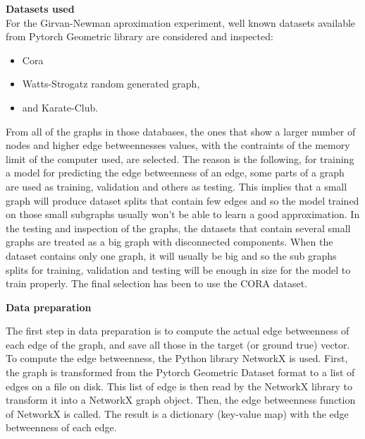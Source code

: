 \textbf{Datasets used}\\
For the Girvan-Newman aproximation experiment, well known datasets available from Pytorch Geometric library are considered and inspected:
\begin{itemize}
	\item Cora
	\item Watts-Strogatz random generated graph,
	\item and Karate-Club.
\end{itemize}
From all of the graphs in those databases, the ones that show a larger number of nodes and higher edge betweennesses values, with the contraints of the memory limit of the computer used, are selected. The reason is the following, for training a model for predicting the edge betweenness of an edge, some parts of a graph are used as training, validation and others as testing. This implies that a small graph will produce dataset splits that contain few edges and so the model trained on those small subgraphs usually won't be able to learn a good approximation. In the testing and inspection of the graphs, the datasets that contain several small graphs are treated as a big graph with disconnected components. When the dataset contains only one graph, it will usually be big and so the sub graphs splits for training, validation and testing will be enough in size for the model to train properly. The final selection has been to use the CORA dataset. %



\textbf{Data preparation}

The first step in data preparation is to compute the actual edge betweenness of each edge of the graph, and save all those in the target (or ground true) vector. To compute the edge betweenness, the Python library NetworkX is used. First, the graph is transformed from the Pytorch Geometric Dataset format to a list of edges on a file on disk. This list of edge is then read by the NetworkX library to transform it into a NetworkX graph object. Then, the edge betweenness function of NetworkX is called. The result is a dictionary (key-value map) with the edge betweenness of each edge.




